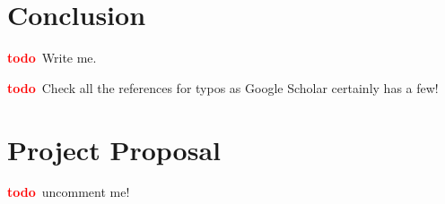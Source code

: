 \documentclass[12pt,a4paper,twoside,openright]{report}
\newcommand{\todo}{\textcolor{red}{\textbf{todo}~}}
\begin{document}
\chapter{Conclusion}

\todo Write me.

\printbibliography
{}
\todo Check all the references for typos as Google Scholar certainly has a few!

\appendix

\chapter{Project Proposal}

\todo uncomment me!
%
\end{document}

